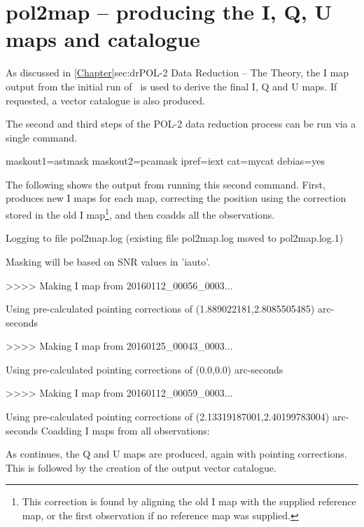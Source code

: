 \section{pol2map -- producing the I, Q, U maps and catalogue}
\label{sec:how-step23}

As discussed in \cref{Chapter}{sec:dr}{POL-2 Data Reduction -- The
  Theory}, the I map output from the initial run of \poltwomap\ is used to
derive the final I, Q and U maps. If requested, a vector catalogue is
also produced.

The second and third steps of the POL-2 data reduction process can be
run via a single command.

\begin{terminalv}
          maskout1=astmask maskout2=pcamask ipref=iext cat=mycat debias=yes
\end{terminalv}

The following shows the output from running this second 
command. First,  produces new I maps for each map, correcting
the position using the correction stored in the old I
map\footnote{This correction is found by aligning the old I map with the
supplied reference map, or the first observation if no reference map was
supplied.}, and then coadds all the observations.

\begin{terminalv}
Logging to file pol2map.log
(existing file pol2map.log moved to pol2map.log.1)

Masking will be based on SNR values in 'iauto'.

>>>>   Making I map from 20160112_00056_0003...

   Using pre-calculated pointing corrections of (1.889022181,2.8085505485) arc-seconds

>>>>   Making I map from 20160125_00043_0003...

   Using pre-calculated pointing corrections of (0.0,0.0) arc-seconds

>>>>   Making I map from 20160112_00059_0003...

   Using pre-calculated pointing corrections of (2.13319187001,2.40199783004) arc-seconds
Coadding I maps from all observations:
\end{terminalv}

As  continues, the Q and U maps are produced, again with
pointing corrections. This is followed by the creation of the output
vector catalogue.

